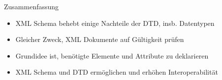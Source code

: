 \documentclass{beamer}
\begin{document}
\begin{frame}{Zusammenfassung}
	
	\begin{itemize}
		\item XML Schema behebt einige Nachteile der DTD, insb. Datentypen
		\item Gleicher Zweck, XML Dokumente auf Gültigkeit prüfen
		\item Grundidee ist, benötigte Elemente und Attribute zu deklarieren
		\item XML Schema und DTD ermöglichen und erhöhen Interoperabilität
	\end{itemize}
	
\end{frame}
\end{document}
